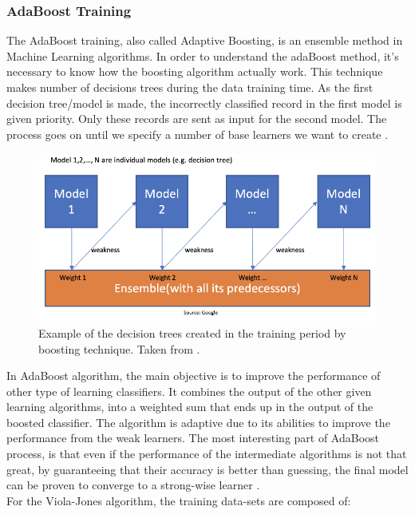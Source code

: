 \documentclass[11pt]{report} %
\begin{document}
\subsubsection{AdaBoost Training}

The AdaBoost training, also called Adaptive Boosting, is an ensemble method in Machine Learning algorithms. In order to understand the adaBoost method, it's necessary to know how the boosting algorithm actually work. This technique makes  number of decisions trees during the data training time. As the first decision tree/model is made, the incorrectly classified record in the first model is given priority. Only these records are sent as input for the second model. The process goes on until we specify a number of base learners we want to create \citep{cite_adaboost_explained}.

\begin{figure}[H]
    \centering
    \includegraphics[width=0.8\linewidth]{assets/imgs/computer_vision/decition_trees.png}
    \caption{Example of the decision trees created in the training period by boosting technique. Taken from \citep{cite_adaboost_explained}.} 
    \label{fig_adaboost_explained}
\end{figure}

In AdaBoost algorithm, the main objective is to improve the performance of other type of learning classifiers. It combines the output of the other given learning algorithms, into a weighted sum that ends up in the output of the boosted classifier. The algorithm is adaptive due to its abilities to improve the performance from the weak learners. The most interesting part of AdaBoost process, is that even if the performance of the intermediate algorithms is not that great, by guaranteeing that their accuracy is better than guessing, the final model can be proven to converge to a strong-wise learner \citep{cite_adaboost_patrick_winston}.\\

For the Viola-Jones algorithm, the training data-sets are composed of:
\end{document}
